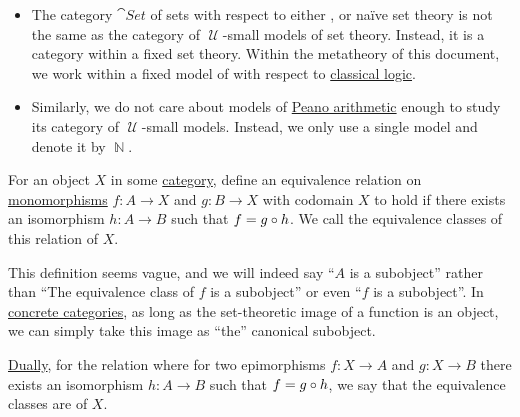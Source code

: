 \begin{example}
\begin{itemize}
    \item The category \hyperref[def:category_of_small_sets]{\( \cat{Set} \)} of sets with respect to either ,  or na\"ive set theory is not the same as the category of \( \mscrU \)-small models of set theory. Instead, it is a category within a fixed set theory. Within the metatheory of this document, we work within a fixed model of  with respect to \hyperref[rem:classical_logic]{classical logic}.

    \item Similarly, we do not care about models of \hyperref[def:peano_arithmetic]{Peano arithmetic} enough to study its category of \( \mscrU \)-small models. Instead, we only use a single model and denote it by \( \BbbN \).
  \end{itemize}
\end{example}

\begin{definition}\label{def:subobject_and_quotient}
  For an object \( X \) in some \hyperref[def:category]{category}, define an equivalence relation on \hyperref[def:morphism_invertibility/left_cancellative]{monomorphisms} \( f: A \to X \) and \( g: B \to X \) with codomain \( X \) to hold if there exists an isomorphism \( h: A \to B \) such that \( f = g \bincirc h \). We call the equivalence classes of this relation  of \( X \).

  This definition seems vague, and we will indeed say \enquote{\( A \) is a subobject} rather than \enquote{The equivalence class of \( f \) is a subobject} or even \enquote{\( f \) is a subobject}. In \hyperref[rem:concrete_categories]{concrete categories}, as long as the set-theoretic image of a function is an object, we can simply take this image as \enquote{the} canonical subobject.

  \hyperref[thm:categorical_principle_of_duality]{Dually}, for the relation where for two epimorphisms \( f: X \to A \) and \( g: X \to B \) there exists an isomorphism \( h: A \to B \) such that \( f = g \bincirc h \), we say that the equivalence classes are  of \( X \).
\end{definition}

